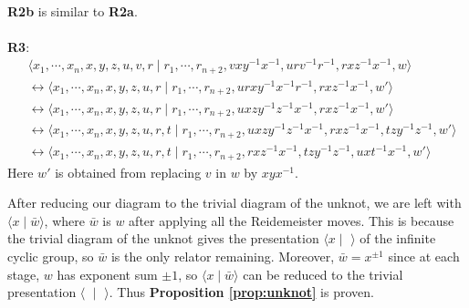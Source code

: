 \\
\textbf{R2b} is similar to \textbf{R2a}.
\\
\\
\textbf{R3}:
\begin{align*}
&\langle x_1,\cdots,x_n,x,y,z,u,v,r\mid r_1,\cdots,r_{n+2},vxy^{-1}x^{-1},urv^{-1}r^{-1},rxz^{-1}x^{-1},w\rangle
\\
&\longleftrightarrow\langle x_1,\cdots,x_n,x,y,z,u,r\mid r_1,\cdots,r_{n+2},urxy^{-1}x^{-1}r^{-1},rxz^{-1}x^{-1},w'\rangle
\\
&\longleftrightarrow\langle x_1,\cdots,x_n,x,y,z,u,r\mid r_1,\cdots,r_{n+2},uxzy^{-1}z^{-1}x^{-1},rxz^{-1}x^{-1},w'\rangle
\\
&\longleftrightarrow\langle x_1,\cdots,x_n,x,y,z,u,r,t\mid r_1,\cdots,r_{n+2},uxzy^{-1}z^{-1}x^{-1},rxz^{-1}x^{-1},tzy^{-1}z^{-1},w'\rangle
\\
&\longleftrightarrow\langle x_1,\cdots,x_n,x,y,z,u,r,t\mid r_1,\cdots,r_{n+2},rxz^{-1}x^{-1},tzy^{-1}z^{-1},uxt^{-1}x^{-1},w'\rangle
\end{align*}
Here $w'$ is obtained from replacing $v$ in $w$ by $xyx^{-1}$.


After reducing our diagram to the trivial diagram of the unknot, we are left with $\langle x \mid \bar w\rangle$, where $\bar w$ is $w$ after applying all the Reidemeister moves. This is because the trivial diagram of the unknot gives the presentation $\langle x\mid \,\,\rangle$ of the infinite cyclic group, so $\bar w$ is the only relator remaining.  Moreover, $\bar w = x^{\pm1}$ since at each stage, $w$ has exponent sum $\pm 1$, so $\langle x \mid \bar w\rangle$ can be reduced to the trivial presentation $\langle \,\, \mid \,\, \rangle$. Thus \textbf{Proposition \ref{prop:unknot}} is proven.

